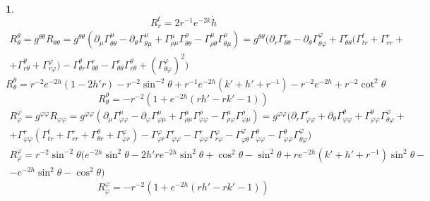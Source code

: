 \documentclass[12pt]{article}
\theoremstyle{definition}
\newtheorem{zad}{}[section]
\begin{document}
\begin{zad}
\begin{equation}
    \boxed{R^t_r=2r^{-1}e^{-2k}\dot{h}}
\end{equation}
\begin{multline}
    R^\theta_\theta=g^{\theta\theta}R_{\theta\theta}=g^{\theta\theta}(\partial_\mu\Gamma^\mu_{\theta\theta}-\partial_\theta\Gamma^\mu_{\theta\mu}+\Gamma^\mu_{\rho\mu}\Gamma^\rho_{\theta\theta}-\Gamma^\mu_{\rho\theta}\Gamma^\rho_{\theta\mu})=g^{\theta\theta}(\partial_r\Gamma^r_{\theta\theta}-\partial_\theta\Gamma^\varphi_{\theta\varphi}+\Gamma^r_{\theta\theta}(\Gamma^t_{tr}+\Gamma^r_{rr}+\\+\Gamma^\theta_{r\theta}+\Gamma^\varphi_{r\varphi})-\Gamma^\theta_{\theta r}\Gamma^r_{\theta\theta}-\Gamma^r_{\theta\theta}\Gamma^\theta_{r\theta}+(\Gamma^\varphi_{\theta\varphi})^2)
\end{multline}
\begin{equation}
    R^\theta_\theta=r^{-2}e^{-2h}(1-2h'r)-r^{-2}\sin^{-2}\theta+r^{-1}e^{-2h}(k'+h'+r^{-1})-r^{-2}e^{-2h}+r^{-2}\cot^2\theta
\end{equation}
\begin{equation}
    \boxed{R^\theta_\theta=-r^{-2}(1+e^{-2h}(rh'-rk'-1))}
\end{equation}
\begin{multline}
    R^\varphi_\varphi=g^{\varphi\varphi}R_{\varphi\varphi}=g^{\varphi\varphi}(\partial_\mu\Gamma^\mu_{\varphi\varphi}-\partial_\varphi\Gamma^\mu_{\varphi\mu}+\Gamma^\mu_{\rho\mu}\Gamma^\rho_{\varphi\varphi}-\Gamma^\mu_{\rho\varphi}\Gamma^\rho_{\varphi\mu})=g^{\varphi\varphi}(\partial_r\Gamma^r_{\varphi\varphi}+\partial_\theta\Gamma^\theta_{\varphi\varphi}+\Gamma^\theta_{\varphi\varphi}\Gamma^\varphi_{\theta\varphi}+\\+\Gamma^r_{\varphi\varphi}(\Gamma^t_{tr}+\Gamma^r_{rr}+\Gamma^\theta_{\theta r}+\Gamma^\varphi_{\varphi r})-\Gamma^\varphi_{\varphi r}\Gamma^r_{\varphi\varphi}-\Gamma^r_{\varphi\varphi}\Gamma^\varphi_{r\varphi}-\Gamma^\varphi_{\varphi\theta}\Gamma^\theta_{\varphi\varphi}-\Gamma^\theta_{\varphi\varphi}\Gamma^\varphi_{\theta\varphi})
\end{multline}
\begin{multline}
    R^\varphi_\varphi=r^{-2}\sin^{-2}\theta(e^{-2h}\sin^2\theta-2h're^{-2h}\sin^2\theta+\cos^2\theta-\sin^2\theta+re^{-2h}(k'+h'+r^{-1})\sin^2\theta-\\-e^{-2h}\sin^2\theta-\cos^2\theta)
\end{multline}
\begin{equation}
    \boxed{R^\varphi_\varphi=-r^{-2}(1+e^{-2h}(rh'-rk'-1))}
\end{equation}

\end{zad}
\end{document}
